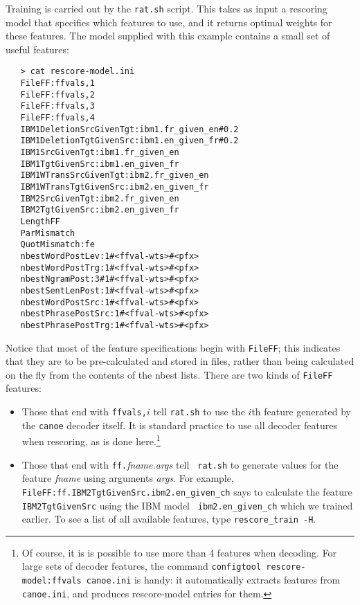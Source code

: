 \documentclass[11pt]{article}
\begin{document}
Training is carried out by the {\tt rat.sh} script. This takes as input a
rescoring model that specifies which features to use, and it returns optimal
weights for these features. The model supplied with this example contains a
small set of useful features:
\begin{verbatim}
   > cat rescore-model.ini
   FileFF:ffvals,1
   FileFF:ffvals,2
   FileFF:ffvals,3
   FileFF:ffvals,4
   IBM1DeletionSrcGivenTgt:ibm1.fr_given_en#0.2
   IBM1DeletionTgtGivenSrc:ibm1.en_given_fr#0.2
   IBM1SrcGivenTgt:ibm1.fr_given_en
   IBM1TgtGivenSrc:ibm1.en_given_fr
   IBM1WTransSrcGivenTgt:ibm2.fr_given_en
   IBM1WTransTgtGivenSrc:ibm2.en_given_fr
   IBM2SrcGivenTgt:ibm2.fr_given_en
   IBM2TgtGivenSrc:ibm2.en_given_fr
   LengthFF
   ParMismatch
   QuotMismatch:fe
   nbestWordPostLev:1#<ffval-wts>#<pfx>
   nbestWordPostTrg:1#<ffval-wts>#<pfx>
   nbestNgramPost:3#1#<ffval-wts>#<pfx>
   nbestSentLenPost:1#<ffval-wts>#<pfx>
   nbestWordPostSrc:1#<ffval-wts>#<pfx>
   nbestPhrasePostSrc:1#<ffval-wts>#<pfx>
   nbestPhrasePostTrg:1#<ffval-wts>#<pfx>
\end{verbatim}
Notice that most of the feature specifications begin with {\tt FileFF}; this
indicates that they are to be pre-calculated and stored in files, rather than
being calculated on the fly from the contents of the nbest lists. There are two
kinds of {\tt FileFF} features:
\begin{itemize}
\item Those that end with {\tt ffvals,}$i$ tell {\tt rat.sh} to use the
$i$\/th feature generated by the {\tt canoe} decoder itself. It is standard
practice to use all decoder features when rescoring, as is done
here.\footnote{Of course, it is is possible to use more than 4 features when
decoding. For large sets of decoder features, the command {\tt configtool
rescore-model:ffvals canoe.ini} is handy: it automatically extracts
features from {\tt canoe.ini}, and produces rescore-model entries for them.}

\item Those that end with {\tt ff.}{\em fname.args} tell {\tt
rat.sh} to generate values for the feature {\em fname} using arguments {\em
args}. For example,\\ {\tt FileFF:ff.IBM2TgtGivenSrc.ibm2.en\_given\_ch} says to
calculate the feature {\tt IBM2TgtGivenSrc} using the IBM model {\tt
ibm2.en\_given\_ch} which we trained earlier. To see a list of all
available features, type {\tt rescore\_train -H}.
\end{itemize}
\end{document}

